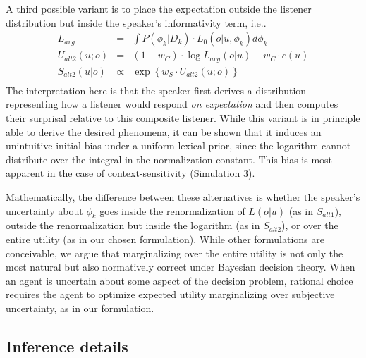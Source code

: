 \documentclass[10pt, man, floatsintext]{apa7}
\begin{document}
A third possible variant is to place the expectation outside the listener distribution but inside the speaker's informativity term, i.e..
$$
\begin{array}{rcl}
L_{avg} & = & \int P(\phi_k | D_k)\cdot L_0(o|u, \phi_k) d\phi_k \\
U_{alt2}(u;o) & = & (1-w_C) \cdot \log L_{avg}(o|u) - w_C \cdot c(u)\\
S_{alt2}(u|o) & \propto & \exp\left\{w_S \cdot U_{alt2}(u;o)\right\} \\
\end{array}
$$
The interpretation here is that the speaker first derives a distribution representing how a listener would respond \emph{on expectation} and then computes their surprisal relative to this composite listener.
While this variant is in principle able to derive the desired phenomena, it can be shown that it induces an unintuitive initial bias under a uniform lexical prior, since the logarithm cannot distribute over the integral in the normalization constant. 
This bias is most apparent in the case of context-sensitivity (Simulation 3).

Mathematically, the difference between these alternatives is whether the speaker's uncertainty about $\phi_k$ goes inside the renormalization of $L(o|u)$ (as in $S_{alt1}$), outside the renormalization but inside the logarithm (as in $S_{alt2}$), or over the entire utility (as in our chosen formulation).
While other formulations are conceivable, we argue that marginalizing over the entire utility is not only the most natural but also normatively correct under Bayesian decision theory. 
When an agent is uncertain about some aspect of the decision problem, rational choice requires the agent to optimize expected utility marginalizing over subjective uncertainty, as in our formulation. 

\subsection{Inference details} 
\end{document}
